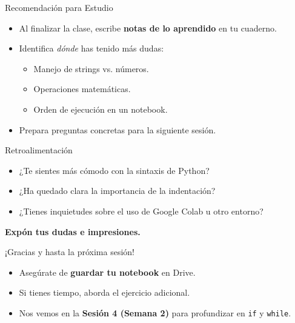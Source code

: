 \documentclass[10pt]{beamer}
\begin{document}
\begin{frame}{Recomendación para Estudio}
  \begin{itemize}
    \item Al finalizar la clase, escribe \textbf{notas de lo aprendido} en tu cuaderno.
    \item Identifica \emph{dónde} has tenido más dudas:
      \begin{itemize}
        \item Manejo de strings vs. números.
        \item Operaciones matemáticas.
        \item Orden de ejecución en un notebook.
      \end{itemize}
    \item Prepara preguntas concretas para la siguiente sesión.
  \end{itemize}
\end{frame}

\begin{frame}{Retroalimentación}
  \begin{itemize}
    \item ¿Te sientes más cómodo con la sintaxis de Python?
    \item ¿Ha quedado clara la importancia de la indentación?
    \item ¿Tienes inquietudes sobre el uso de Google Colab u otro entorno?
  \end{itemize}
  \vspace{0.3cm}
  \textbf{Expón tus dudas e impresiones.}
\end{frame}

\begin{frame}
  \huge{\centerline{¡Gracias y hasta la próxima sesión!}}
  \vspace{0.3cm}
  \normalsize
  \begin{itemize}
    \item Asegúrate de \textbf{guardar tu notebook} en Drive.
    \item Si tienes tiempo, aborda el ejercicio adicional.
    \item Nos vemos en la \textbf{Sesión 4 (Semana 2)} para profundizar en \texttt{if} y \texttt{while}.
  \end{itemize}
\end{frame}
\end{document}
